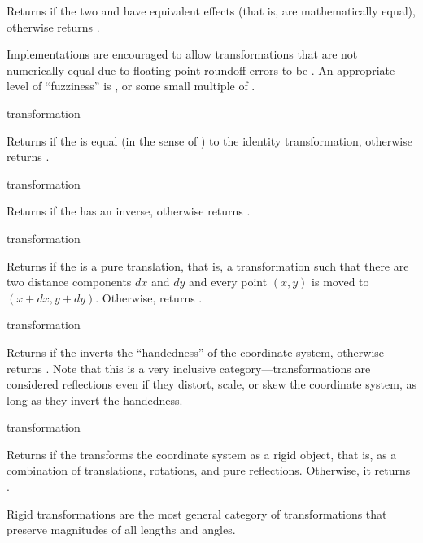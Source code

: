 Returns  if the two   and
 have equivalent effects (that is, are mathematically
equal), otherwise returns .

Implementations are encouraged to allow transformations that are not numerically
equal due to floating-point roundoff errors to be .  An
appropriate level of ``fuzziness'' is , or some small
multiple of .


 {transformation} 

Returns  if the   is equal
(in the sense of ) to the identity transformation,
otherwise returns .

 {transformation} 

Returns  if the   has an
inverse, otherwise returns .

 {transformation}

Returns  if the   is a pure
translation, that is, a transformation such that there are two distance
components $dx$ and $dy$ and every point $(x,y)$ is moved to $(x+dx,y+dy)$.
Otherwise,  returns .

 {transformation}

Returns  if the   inverts
the ``handedness'' of the coordinate system, otherwise returns .
Note that this is a very inclusive category---transformations are considered
reflections even if they distort, scale, or skew the coordinate system, as long
as they invert the handedness.

 {transformation}

Returns  if the   transforms
the coordinate system as a rigid object, that is, as a combination of
translations, rotations, and pure reflections.  Otherwise, it returns
.

Rigid transformations are the most general category of transformations that
preserve magnitudes of all lengths and angles.

